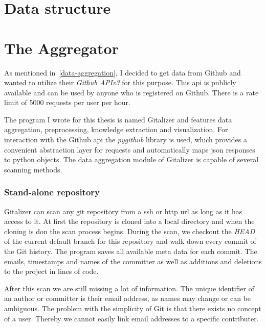 \section{Data structure}


\section{The Aggregator}

As mentioned in~\ref{data-aggregation}, I decided to get data from Github and wanted to utilize their \emph{Github APIv3} for this purpose.
This \ac{api} is publicly available and can be used by anyone who is registered on Github.
There is a rate limit of 5000 requests per user per hour.

The program I wrote for this thesis is named Gitalizer and features data aggregation, preprocessing, knowledge extraction and visualization.
For interaction with the Github \ac{api} the \emph{pygithub} library is used, which provides a convenient abstraction layer for requests and automatically maps \ac{json} responses to python objects.
The data aggregation module of Gitalizer is capable of several scanning methods.

\subsubsection{Stand-alone repository}\label{stand-alone-repository}
Gitalizer can scan any git repository from a \ac{ssh} or \ac{http} \acs{url} as long as it has access to it.
At first the repository is cloned into a local directory and when the cloning is don the scan process begins.
During the scan, we checkout the \emph{HEAD} of the current default branch for this repository and walk down every commit of the Git history.
The program saves all available meta data for each commit.
The emails, timestamps and names of the committer as well as additions and deletions to the project in lines of code.

After this scan we are still missing a lot of information.
The unique identifier of an author or committer is their email address, as names may change or can be ambiguous.
The problem with the simplicity of Git is that there exists no concept of a user.
Thereby we cannot easily link email addresses to a specific contributer.

